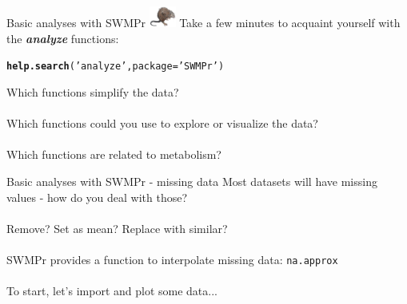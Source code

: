 \documentclass[xcolor=dvipsnames,serif]{beamer}\usepackage[]{graphicx}\usepackage[]{color}
\makeatletter
\newcommand{\hlstr}[1]{\textcolor[rgb]{0.192,0.494,0.8}{#1}}%
\newcommand{\hlstd}[1]{\textcolor[rgb]{0.345,0.345,0.345}{#1}}%
\newcommand{\hlkwc}[1]{\textcolor[rgb]{0.333,0.667,0.333}{#1}}%
\newcommand{\hlkwd}[1]{\textcolor[rgb]{0.737,0.353,0.396}{\textbf{#1}}}%
\newenvironment{kframe}{%
 \def\at@end@of@kframe{}%
 \ifinner\ifhmode%
  \def\at@end@of@kframe{\end{minipage}}%
  \begin{minipage}{\columnwidth}%
 \fi\fi%
 \def\FrameCommand##1{\hskip\@totalleftmargin \hskip-\fboxsep
 \colorbox{shadecolor}{##1}\hskip-\fboxsep
     \hskip-\linewidth \hskip-\@totalleftmargin \hskip\columnwidth}%
 \MakeFramed {\advance\hsize-\width
   \@totalleftmargin\z@ \linewidth\hsize
   \@setminipage}}%
 {\par\unskip\endMakeFramed%
 \at@end@of@kframe}
\newenvironment{knitrout}{}{} %
\newcommand{\Bigtxt}[1]{\textbf{\textit{#1}}}
\makeatother
\begin{document}
\begin{frame}[fragile]{Basic analyses with SWMPr \includegraphics[width = 0.065\textwidth]{imgs/swmprat.png}}
\onslide<+->
Take a few minutes to acquaint yourself with the \Bigtxt{analyze} functions:
\begin{knitrout}\scriptsize
{}\color{fgcolor}\begin{kframe}
\begin{alltt}
\hlkwd{help.search}\hlstd{(}\hlstr{'analyze'}\hlstd{,} \hlkwc{package} \hlstd{=} \hlstr{'SWMPr'}\hlstd{)}
\end{alltt}
\end{kframe}
\end{knitrout}
\onslide<+->
Which functions simplify the data?  \\~\\
Which functions could you use to explore or visualize the data? \\~\\
Which functions are related to metabolism? 
\end{frame}

\begin{frame}{Basic analyses with SWMPr - missing data}
Most datasets will have missing values - how do you deal with those? \\~\\
Remove? Set as mean? Replace with similar? \\~\\
SWMPr provides a function to interpolate missing data: \texttt{na.approx} \\~\\
To start, let's import and plot some data...
\end{frame}
\end{document}
